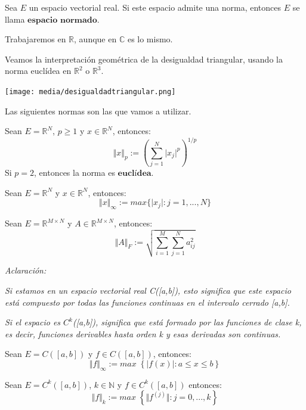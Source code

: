 \begin{ndef}
Sea $E$ un espacio vectorial real. Si este espacio admite una norma, entonces $E$ se llama $\textbf{espacio normado}$.
\end{ndef}

Trabajaremos en $\mathbb{R}$, aunque en $\mathbb{C}$ es lo mismo.

Veamos la interpretación geométrica de la desigualdad triangular, usando la norma euclídea en $\mathbb{R}^2$ o $\mathbb{R}^3$.

\texttt{[image: media/desigualdadtriangular.png]}

Las siguientes normas son las que vamos a utilizar.

\begin{ndef}[Norma p]
Sean $E = \mathbb{R}^N$, $p \geq 1$ y $x \in \mathbb{R}^N$, entonces:
\[ \Vert x \Vert _{p} := \left( \sum_{j=1}^{N} \vert x_{j} \vert ^p \right) ^{1/p} \]
Si $p = 2$, entonces la norma es $\textbf{euclídea}$.
\end{ndef}

\begin{ndef}
Sean $E = \mathbb{R}^N$ y $x \in \mathbb{R}^N$, entonces:
\[ \Vert x \Vert _{\infty} := max \lbrace \vert x_{j} \vert : j = 1,...,N \rbrace \]
\end{ndef}

\begin{ndef}
Sean $E = \mathbb{R}^{M \times N}$ y $A \in \mathbb{R}^{M \times N}$, entonces:
\[ \Vert A \Vert _F := \sqrt{\sum_{i=1}^{M} \sum_{j=1}^{N} a_{ij}^2} \]
\end{ndef}

\textit{Aclaración:}

\textit{Si estamos en un espacio vectorial real C([a,b]), esto significa que este espacio está compuesto por todas las funciones}
\textit{continuas en el intervalo cerrado [a,b].}

\textit{Si el espacio es $C^k$([a,b]), significa que está formado por las funciones de clase k, es decir, funciones derivables hasta}
\textit{orden k y esas derivadas son continuas.}\\


\begin{ndef}
Sean $E = C([a,b])$ y $f \in C([a,b])$, entonces:
\[ \Vert f \Vert _\infty := max \; \left\lbrace \vert f(x) \vert : a \leq x \leq b \right\rbrace \]
\end{ndef}

\begin{ndef}
Sean $E = C^k([a,b])$, $k \in \mathbb{N}$ y $f \in C^k([a,b])$ entonces:
\[ \Vert f \Vert _k := max \; \left\lbrace \Vert f^{(j)} \Vert : j = 0,...,k \right\rbrace \]
\end{ndef}

